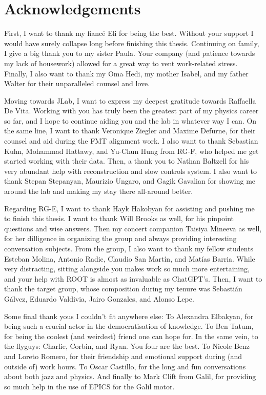 \section*{Acknowledgements}
    First, I want to thank my fiancé Eli for being the best.
    Without your support I would have surely collapse long before finishing this thesis.
    Continuing on family, I give a big thank you to my sister Paula.
    Your company (and patience towards my lack of housework) allowed for a great way to vent work-related stress.
    Finally, I also want to thank my Oma Hedi, my mother Isabel, and my father Walter for their unparalleled counsel and love.

    Moving towards JLab, I want to express my deepest gratitude towards Raffaella De Vita.
    Working with you has truly been the greatest part of my physics career so far, and I hope to continue aiding you and the lab in whatever way I can.
    On the same line, I want to thank Veronique Ziegler and Maxime Defurne, for their counsel and aid during the FMT alignment work.
    I also want to thank Sebastian Kuhn, Mohammad Hattawy, and Yu-Chun Hung from RG-F, who helped me get started working with their data.
    Then, a thank you to Nathan Baltzell for his very abundant help with reconstruction and slow controls system.
    I also want to thank Stepan Stepanyan, Maurizio Ungaro, and Gagik Gavalian for showing me around the lab and making my stay there all-around better.

    Regarding RG-E, I want to thank Hayk Hakobyan for assisting and pushing me to finish this thesis.
    I want to thank Will Brooks as well, for his pinpoint questions and wise answers.
    Then my concert companion Taisiya Mineeva as well, for her dilligence in organizing the group and always providing interesting conversation subjects.
    From the group, I also want to thank my fellow students Esteban Molina, Antonio Radic, Claudio San Martín, and Matías Barria.
    While very distracting, sitting alongside you makes work so much more entertaining, and your help with ROOT is almost as invaluable as ChatGPT's.
    Then, I want to thank the target group, whose composition during my tenure was Sebastián Gálvez, Eduardo Valdivia, Jairo Gonzales, and Alonso Lepe.

    Some final thank yous I couldn't fit anywhere else:
    To Alexandra Elbakyan, for being such a crucial actor in the democratisation of knowledge.
    To Ben Tatum, for being the coolest (and weirdest) friend one can hope for.
    In the same vein, to the flyguys: Charlie, Corbin, and Ryan.
    You four are the best.
    To Nicole Benz and Loreto Romero, for their friendship and emotional support during (and outside of) work hours.
    To Oscar Castillo, for the long and fun conversations about both jazz and physics.
    And finally to Mark Clift from Galil, for providing so much help in the use of EPICS for the Galil motor.
